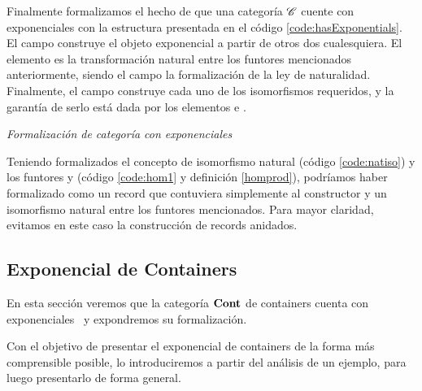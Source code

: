 Finalmente formalizamos el hecho de que una categoría $\mathscr{C}$ cuente con exponenciales con la estructura presentada en el código \ref{code:hasExponentials}. El campo  construye el objeto exponencial a partir de otros dos cualesquiera. El elemento  es la transformación natural entre los funtores mencionados anteriormente, siendo el campo  la formalización de la ley de naturalidad. Finalmente, el campo  construye cada uno de los isomorfismos requeridos, y la garantía de serlo está dada por los elementos  e . 

\begin{agdacode}{\it Formalización de categoría con exponenciales}\label{code:hasExponentials}
 
\end{agdacode}

\begin{remark} Teniendo formalizados el concepto de isomorfismo natural (código \ref{code:natiso}) y los funtores  y  (código \ref{code:hom1} y definición \ref{homprod}), podríamos haber formalizado  como un record que contuviera simplemente al constructor  y un isomorfismo natural entre los funtores mencionados. Para mayor claridad, evitamos en este caso la construcción de records anidados.   
\end{remark}

\subsection{Exponencial de Containers}
En esta sección veremos que la categoría $\mathbf{Cont}$ de containers cuenta con exponenciales~\cite{alti:2010} y expondremos su formalización.

Con el objetivo de presentar el exponencial de containers de la forma más comprensible posible, lo introduciremos a partir del análisis de un ejemplo, para luego presentarlo de forma general.

